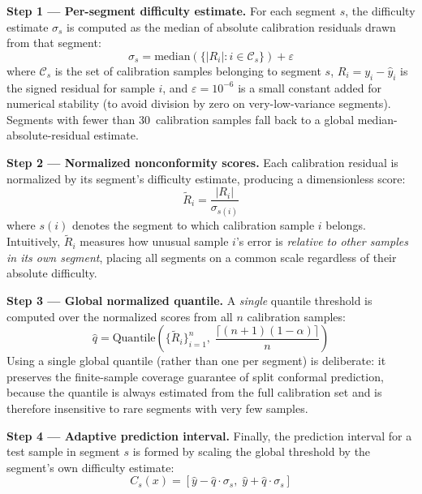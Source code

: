 \textbf{Step 1 --- Per-segment difficulty estimate.} For each segment $s$, the difficulty estimate $\sigma_s$ is computed as the median of absolute calibration residuals drawn from that segment:
\begin{equation}
    \sigma_s = \text{median}\!\left(\{|R_i| : i \in \mathcal{C}_s\}\right) + \varepsilon
    \label{eq:segment_sigma}
\end{equation}
where $\mathcal{C}_s$ is the set of calibration samples belonging to segment $s$, $R_i = y_i - \hat{y}_i$ is the signed residual for sample $i$, and $\varepsilon = 10^{-6}$ is a small constant added for numerical stability (to avoid division by zero on very-low-variance segments). Segments with fewer than 30~calibration samples fall back to a global median-absolute-residual estimate.

\textbf{Step 2 --- Normalized nonconformity scores.} Each calibration residual is normalized by its segment's difficulty estimate, producing a dimensionless score:
\begin{equation}
    \tilde{R}_i = \frac{|R_i|}{\sigma_{s(i)}}
    \label{eq:normalized_score}
\end{equation}
where $s(i)$ denotes the segment to which calibration sample $i$ belongs. Intuitively, $\tilde{R}_i$ measures how unusual sample $i$'s error is \emph{relative to other samples in its own segment}, placing all segments on a common scale regardless of their absolute difficulty.

\textbf{Step 3 --- Global normalized quantile.} A \emph{single} quantile threshold is computed over the normalized scores from all $n$ calibration samples:
\begin{equation}
    \hat{q} = \text{Quantile}\!\left(\{\tilde{R}_i\}_{i=1}^{n},\; \frac{\lceil(n+1)(1-\alpha)\rceil}{n}\right)
    \label{eq:normalized_quantile}
\end{equation}
Using a single global quantile (rather than one per segment) is deliberate: it preserves the finite-sample coverage guarantee of split conformal prediction, because the quantile is always estimated from the full calibration set and is therefore insensitive to rare segments with very few samples.

\textbf{Step 4 --- Adaptive prediction interval.} Finally, the prediction interval for a test sample in segment $s$ is formed by scaling the global threshold by the segment's own difficulty estimate:
\begin{equation}
    C_s(x) = [\hat{y} - \hat{q}\cdot\sigma_s,\; \hat{y} + \hat{q}\cdot\sigma_s]
    \label{eq:segment_interval}
\end{equation}

